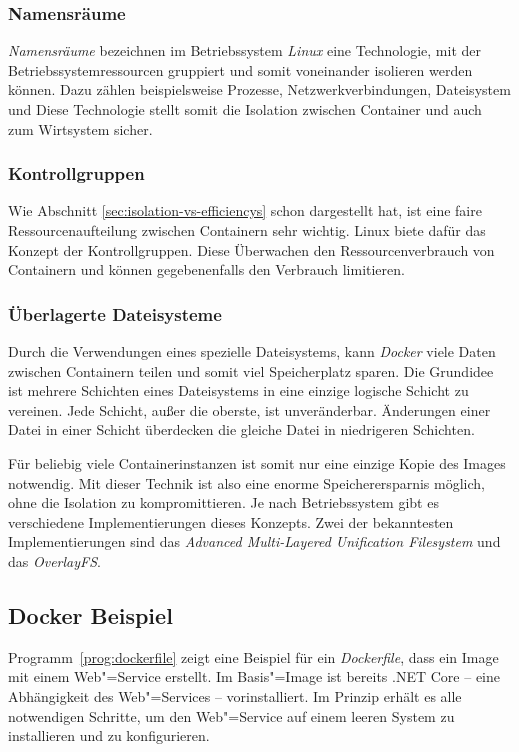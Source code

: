 \subsubsection{Namensräume}

\textit{Namensräume} bezeichnen im Betriebssystem \textit{Linux} eine Technologie, mit der Betriebssystemressourcen gruppiert und somit voneinander isolieren werden können. Dazu zählen beispielsweise Prozesse, Netzwerkverbindungen, Dateisystem und \usw Diese Technologie stellt somit die Isolation zwischen Container und auch zum Wirtsystem sicher.

\subsubsection{Kontrollgruppen}

Wie Abschnitt \ref{sec:isolation-vs-efficiencys} schon dargestellt hat, ist eine faire Ressourcenaufteilung zwischen Containern sehr wichtig. Linux biete dafür das Konzept der Kontrollgruppen. Diese Überwachen den Ressourcenverbrauch von Containern und können gegebenenfalls den Verbrauch limitieren.

\subsubsection{Überlagerte Dateisysteme}

Durch die Verwendungen eines spezielle Dateisystems, kann \textit{Docker} viele Daten zwischen Containern teilen und somit viel Speicherplatz sparen. Die Grundidee ist mehrere Schichten eines Dateisystems in eine einzige logische Schicht zu vereinen. Jede Schicht, außer die oberste, ist unveränderbar. Änderungen einer Datei in einer Schicht überdecken die gleiche Datei in niedrigeren Schichten.

Für beliebig viele Containerinstanzen ist somit nur eine einzige Kopie des Images notwendig. Mit dieser Technik ist also eine enorme Speicherersparnis möglich, ohne die Isolation zu kompromittieren. Je nach Betriebssystem gibt es verschiedene Implementierungen dieses Konzepts. Zwei der bekanntesten Implementierungen sind das \textit{Advanced Multi-Layered Unification File\-system} und das \textit{OverlayFS}.

\subsection{Docker Beispiel}

Programm~\ref{prog:dockerfile} zeigt eine Beispiel für ein \textit{Dockerfile}, dass ein Image mit einem Web"=Service erstellt. Im Basis"=Image ist bereits .NET Core -- eine Abhängigkeit des Web"=Services -- vorinstalliert. Im Prinzip erhält es alle notwendigen Schritte, um den Web"=Service auf einem leeren System zu installieren und zu konfigurieren.

